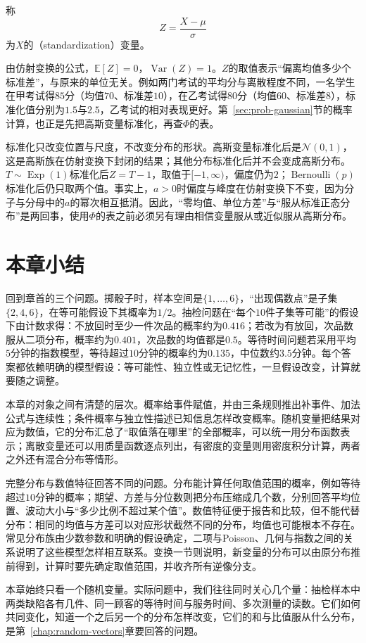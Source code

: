 \begin{definition}[标准化]
\label{def:prob-standardization}
称
\[
  Z=\frac{X-\mu}{\sigma}
\]
为$X$的（standardization）变量。
\end{definition}

由仿射变换的公式，$\mathbb{E}[Z]=0$，$\operatorname{Var}(Z)=1$。$Z$的取值表示“偏离均值多少个标准差”，与原来的单位无关。例如两门考试的平均分与离散程度不同，一名学生在甲考试得$85$分（均值$70$、标准差$10$），在乙考试得$80$分（均值$60$、标准差$8$），标准化值分别为$1.5$与$2.5$，乙考试的相对表现更好。第~\ref{sec:prob-gaussian}节的概率计算，也正是先把高斯变量标准化，再查$\Phi$的表。

标准化只改变位置与尺度，不改变分布的形状。高斯变量标准化后是$\mathcal{N}(0,1)$，这是高斯族在仿射变换下封闭的结果；其他分布标准化后并不会变成高斯分布。$T\sim\operatorname{Exp}(1)$标准化后$Z=T-1$，取值于$[-1,\infty)$，偏度仍为$2$；$\operatorname{Bernoulli}(p)$标准化后仍只取两个值。事实上，$a>0$时偏度与峰度在仿射变换下不变，因为分子与分母中的$a$的幂次相互抵消。因此，“零均值、单位方差”与“服从标准正态分布”是两回事，使用$\Phi$的表之前必须另有理由相信变量服从或近似服从高斯分布。

\section{本章小结}
\label{sec:prob-summary}

回到章首的三个问题。掷骰子时，样本空间是$\{1,\dots,6\}$，“出现偶数点”是子集$\{2,4,6\}$，在等可能假设下其概率为$1/2$。抽检问题在“每个$10$件子集等可能”的假设下由计数求得：不放回时至少一件次品的概率约为$0.416$；若改为有放回，次品数服从二项分布，概率约为$0.401$，次品数的均值都是$0.5$。等待时间问题若采用平均$5$分钟的指数模型，等待超过$10$分钟的概率约为$0.135$，中位数约$3.5$分钟。每个答案都依赖明确的模型假设：等可能性、独立性或无记忆性，一旦假设改变，计算就要随之调整。

本章的对象之间有清楚的层次。概率给事件赋值，并由三条规则推出补事件、加法公式与连续性；条件概率与独立性描述已知信息怎样改变概率。随机变量把结果对应为数值，它的分布汇总了“取值落在哪里”的全部概率，可以统一用分布函数表示；离散变量还可以用质量函数逐点列出，有密度的变量则用密度积分计算，两者之外还有混合分布等情形。

完整分布与数值特征回答不同的问题。分布能计算任何取值范围的概率，例如等待超过$10$分钟的概率；期望、方差与分位数则把分布压缩成几个数，分别回答平均位置、波动大小与“多少比例不超过某个值”。数值特征便于报告和比较，但不能代替分布：相同的均值与方差可以对应形状截然不同的分布，均值也可能根本不存在。常见分布族由少数参数和明确的假设确定，二项与Poisson、几何与指数之间的关系说明了这些模型怎样相互联系。变换一节则说明，新变量的分布可以由原分布推前得到，计算时要先确定取值范围，并收齐所有逆像分支。

本章始终只看一个随机变量。实际问题中，我们往往同时关心几个量：抽检样本中两类缺陷各有几件、同一顾客的等待时间与服务时间、多次测量的读数。它们如何共同变化，知道一个之后另一个的分布怎样改变，它们的和与比值服从什么分布，是第~\ref{chap:random-vectors}章要回答的问题。
